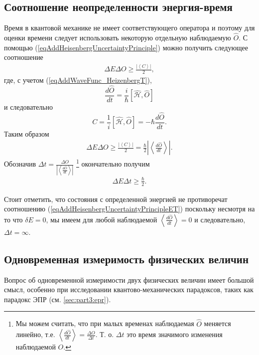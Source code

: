 \subsection{Соотношение неопределенности энергия-время}
\label{AddHeisenbergUncertaintyPrincipleEnergyTime}
Время в квантовой механике не имеет соответствующего оператора и
поэтому для оценки времени следует использовать некоторую отдельную
наблюдаемую $\hat{O}$. С помощью
(\ref{eqAddHeisenbergUncertaintyPrinciple}) можно получить следующее
соотношение
\begin{eqnarray}
  \Delta E \Delta O \ge \frac{\left|\left< C \right>\right|}{2},
  \nonumber
\end{eqnarray}
где, с учетом (\ref{eqAddWaveFunc_HeizenbergT}),
\[
\frac{d \hat{O}}{d t} = \frac{i}{\hbar}
\left[\hat{\mathcal{H}}, \hat{O}\right]
\]
и следовательно
\[
C = \frac{1}{i}\left[\hat{\mathcal{H}}, \hat{O}\right] =
- \hbar \frac{d \hat{O}}{d t}.
\]
Таким образом
\begin{eqnarray}
  \Delta E \Delta O \ge \frac{\left|\left< C \right>\right|}{2} =
  \frac{\hbar}{2}\left|\left<\frac{d \hat{O}}{d t}\right>\right|.
  \nonumber
\end{eqnarray}
Обозначив $\Delta t = \frac{\Delta O}{\left|\left<\frac{d \hat{O}}{d
    t}\right>\right|}$
\footnote{
  Мы можем считать, что при малых временах наблюдаемая $\hat{O}$
  меняется линейно, т.е. $\left<\frac{d \hat{O}}{dt}\right> =
  \frac{\Delta O}{\Delta t}$. Т. о. $\Delta t$ это время значимого
  изменения наблюдаемой $O$. 
}
окончательно получим
\begin{eqnarray}
  \Delta E \Delta t \ge \frac{\hbar}{2}.
  \label{eqAddHeisenbergUncertaintyPrincipleET}
\end{eqnarray}

Стоит отметить, что состояния с определенной энергией не противоречат
соотношению (\ref{eqAddHeisenbergUncertaintyPrincipleET}) поскольку
несмотря на то что $\delta E = 0$, мы имеем для любой наблюдаемой
$\left<\frac{d \hat{O}}{dt}\right> = 0$ и следовательно, $\Delta t =
\infty$. 

\subsection{Одновременная измеримость физических величин}
\label{AddHeisenbergUncertaintyPrincipleMesuranmet}
Вопрос об одновременной измеримости двух физических
величин имеет большой смысл, особенно при исследовании
квантово-механических парадоксов, таких как парадокс
ЭПР (см. \autoref{sec:part3:epr}).

